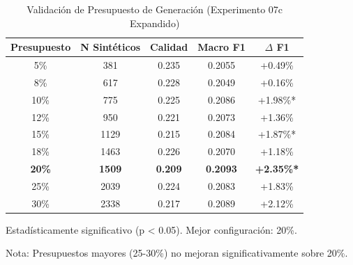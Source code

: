 \begin{table}[htbp]
\centering
\caption{Validación de Presupuesto de Generación (Experimento 07c Expandido)}
\label{tab:budget_expanded}
\begin{tabular}{ccccc}
\toprule
\textbf{Presupuesto} & \textbf{N Sintéticos} & \textbf{Calidad} & \textbf{Macro F1} & \textbf{$\Delta$ F1} \\
\midrule
5\%  & 381  & 0.235 & 0.2055 & +0.49\% \\
8\%  & 617  & 0.228 & 0.2049 & +0.16\% \\
10\% & 775  & 0.225 & 0.2086 & +1.98\%* \\
12\% & 950  & 0.221 & 0.2073 & +1.36\% \\
15\% & 1129 & 0.215 & 0.2084 & +1.87\%* \\
18\% & 1463 & 0.226 & 0.2070 & +1.18\% \\
\rowcolor{green!20}
\textbf{20\%} & \textbf{1509} & \textbf{0.209} & \textbf{0.2093} & \textbf{+2.35\%*} \\
25\% & 2039 & 0.224 & 0.2083 & +1.83\% \\
30\% & 2338 & 0.217 & 0.2089 & +2.12\% \\
\bottomrule
\end{tabular}
\begin{tablenotes}
\small
\item * Estadísticamente significativo (p < 0.05). Mejor configuración: 20\%.
\item Nota: Presupuestos mayores (25-30\%) no mejoran significativamente sobre 20\%.
\end{tablenotes}
\end{table}
